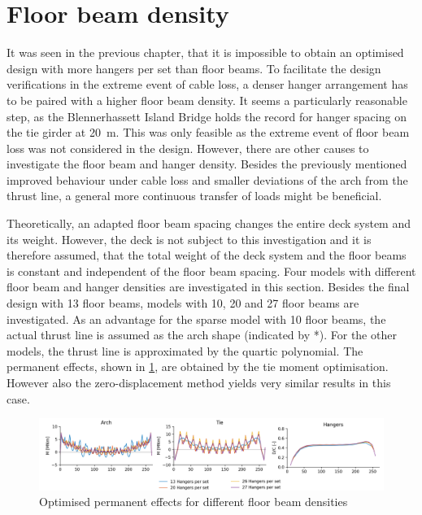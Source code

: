 \section{Floor beam density} \label{sec:floor_beam_density}
It was seen in the previous chapter, that it is impossible to obtain an optimised design with more hangers per set than floor beams. To facilitate the design verifications in the extreme event of cable loss, a denser hanger arrangement has to be paired with a higher floor beam density. It seems a particularly reasonable step, as the Blennerhassett Island Bridge holds the record for hanger spacing on the tie girder at \SI{20}{m}. This was only feasible as the extreme event of floor beam loss was not considered in the design. However, there are other causes to investigate the floor beam and hanger density. Besides the previously mentioned improved behaviour under cable loss and smaller deviations of the arch from the thrust line, a general more continuous transfer of loads might be beneficial. \medskip

Theoretically, an adapted floor beam spacing changes the entire deck system and its weight. However, the deck is not subject to this investigation and it is therefore assumed, that the total weight of the deck system and the floor beams is constant and independent of the floor beam spacing. Four models with different floor beam and hanger densities are investigated in this section. Besides the final design with 13 floor beams, models with 10, 20 and 27 floor beams are investigated. As an advantage for the sparse model with 10 floor beams, the actual thrust line is assumed as the arch shape (indicated by *). For the other models, the thrust line is approximated by the quartic polynomial. The permanent effects, shown in \cref{fig:fb_permanent}, are obtained by the tie moment optimisation. However also the zero-displacement method yields very similar results in this case.

\begin{figure}[H]
    \centering
    \includegraphics[trim={0 0 1cm 0},clip, width=\textwidth]{calculations/hanger density/dead loading_plot.png}
    \caption{Optimised permanent effects for different floor beam densities}
    \label{fig:fb_permanent}
\end{figure}


